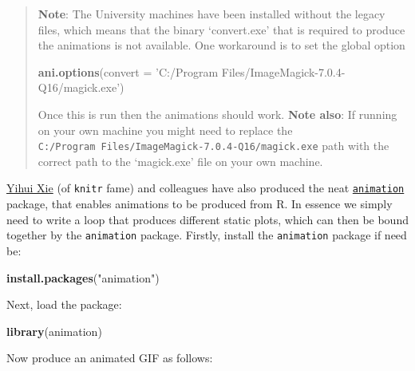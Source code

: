 \documentclass[]{book}
\newenvironment{Shaded}{\begin{snugshade}}{\end{snugshade}}
\newcommand{\KeywordTok}[1]{\textcolor[rgb]{0.13,0.29,0.53}{\textbf{{#1}}}}
\newcommand{\DataTypeTok}[1]{\textcolor[rgb]{0.13,0.29,0.53}{{#1}}}
\newcommand{\DecValTok}[1]{\textcolor[rgb]{0.00,0.00,0.81}{{#1}}}
\newcommand{\FloatTok}[1]{\textcolor[rgb]{0.00,0.00,0.81}{{#1}}}
\newcommand{\StringTok}[1]{\textcolor[rgb]{0.31,0.60,0.02}{{#1}}}
\newcommand{\NormalTok}[1]{{#1}}
\theoremstyle{definition}
\theoremstyle{definition}
\theoremstyle{definition}
\theoremstyle{remark}
\begin{document}
\begin{quote}
\textbf{Note}: The University machines have been installed without the
legacy files, which means that the binary `convert.exe' that is required
to produce the animations is not available. One workaround is to set the
global option

\begin{Shaded}
\begin{Highlighting}[]
\KeywordTok{ani.options}\NormalTok{(}\DataTypeTok{convert =} \StringTok{'C:/Program Files/ImageMagick-7.0.4-Q16/magick.exe'}\NormalTok{)}
\end{Highlighting}
\end{Shaded}

Once this is run then the animations should work. \textbf{Note also}: If
running on your own machine you might need to replace the
\texttt{C:/Program\ Files/ImageMagick-7.0.4-Q16/magick.exe} path with
the correct path to the `magick.exe' file on your own machine.
\end{quote}

\href{(https://yihui.name/en/)}{Yihui Xie} (of \texttt{knitr} fame) and
colleagues have also produced the neat
\href{https://cran.r-project.org/web/packages/animation/}{\texttt{animation}}
package, that enables animations to be produced from R. In essence we
simply need to write a loop that produces different static plots, which
can then be bound together by the \texttt{animation} package. Firstly,
install the \texttt{animation} package if need be:

\begin{Shaded}
\begin{Highlighting}[]
\KeywordTok{install.packages}\NormalTok{(}\StringTok{"animation"}\NormalTok{)}
\end{Highlighting}
\end{Shaded}

Next, load the package:

\begin{Shaded}
\begin{Highlighting}[]
\KeywordTok{library}\NormalTok{(animation)}
\end{Highlighting}
\end{Shaded}

Now produce an animated GIF as follows:

\begin{Shaded}
\end{Shaded}
\end{document}
